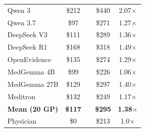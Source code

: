 \begin{table}[p]
\begin{tabular}{l c c c c}
Qwen 3 & \$212 & & \$440 & 2.07$\times$ \\
\rowcolor{gray!8} Qwen 3.7 & \$97 & & \$271 & 1.27$\times$ \\
DeepSeek V3 & \$111 & & \$289 & 1.36$\times$ \\
\rowcolor{gray!8} DeepSeek R1 & \$168 & & \$318 & 1.49$\times$ \\
\midrule
OpenEvidence & \$135 & & \$274 & 1.29$\times$ \\
\rowcolor{gray!8} MedGemma 4B & \$99 & & \$226 & 1.06$\times$ \\
MedGemma 27B & \$129 & & \$297 & 1.40$\times$ \\
\rowcolor{gray!8} Meditron & \$132 & & \$249 & 1.17$\times$ \\
\midrule
\rowcolor{gray!8} \textbf{Mean (20 GP)} & \textbf{\$117} & & \textbf{\$295} & \textbf{1.38$\times$} \\
Physician & \$0 & & \$213 & 1.0$\times$ \\
\bottomrule
\end{tabular}
\end{table}
